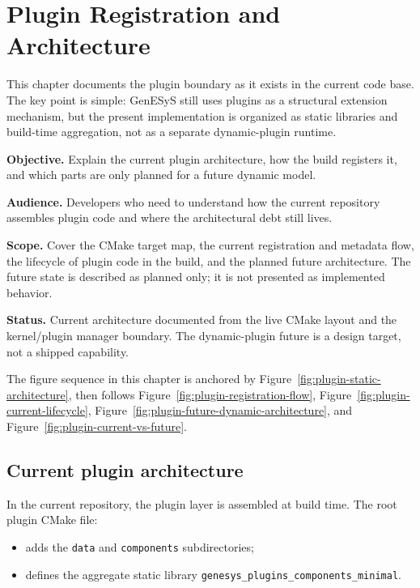 \chapter{Plugin Registration and Architecture}
\label{chap:plugin-registration-and-architecture}

This chapter documents the plugin boundary as it exists in the current code
base. The key point is simple: GenESyS still uses plugins as a structural
extension mechanism, but the present implementation is organized as static
libraries and build-time aggregation, not as a separate dynamic-plugin
runtime.

\noindent\textbf{Objective.} Explain the current plugin architecture, how the
build registers it, and which parts are only planned for a future dynamic
model.

\noindent\textbf{Audience.} Developers who need to understand how the current
repository assembles plugin code and where the architectural debt still lives.

\noindent\textbf{Scope.} Cover the CMake target map, the current registration
and metadata flow, the lifecycle of plugin code in the build, and the planned
future architecture. The future state is described as planned only; it is not
presented as implemented behavior.

\noindent\textbf{Status.} Current architecture documented from the live CMake
layout and the kernel/plugin manager boundary. The dynamic-plugin future is a
design target, not a shipped capability.

The figure sequence in this chapter is anchored by Figure~\ref{fig:plugin-static-architecture},
then follows Figure~\ref{fig:plugin-registration-flow},
Figure~\ref{fig:plugin-current-lifecycle},
Figure~\ref{fig:plugin-future-dynamic-architecture}, and
Figure~\ref{fig:plugin-current-vs-future}.

\section{Current plugin architecture}
\label{sec:plugin-current-architecture}

In the current repository, the plugin layer is assembled at build time. The
root plugin CMake file:
\begin{itemize}
 \item adds the \texttt{data} and \texttt{components} subdirectories;
 \item defines the aggregate static library
   \texttt{genesys\_plugins\_components\_minimal}.
\end{itemize}


